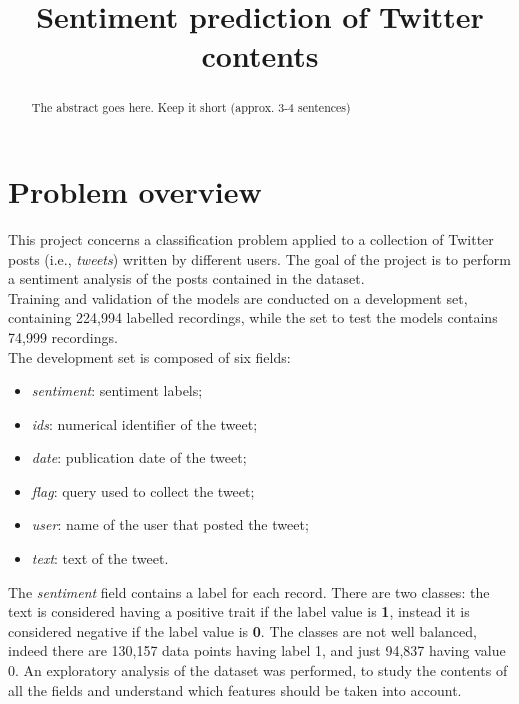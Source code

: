 \documentclass[conference]{IEEEtran}
\begin{document}
\title{Sentiment prediction of Twitter contents}

\author{
}

\maketitle

\begin{abstract}
The abstract goes here. Keep it short (approx. 3-4 sentences)
\end{abstract}

\section{Problem overview}
This project concerns a classification problem applied to a collection of Twitter posts (i.e., \textit{tweets}) written by different users. The goal of the project is to perform a sentiment analysis of the posts contained in the dataset.\\
Training and validation of the models are conducted on a development set, containing 224,994 labelled recordings, while the set to test the models contains 74,999 recordings.\\
The development set is composed of six fields:
\begin{itemize}
    \item \textit{sentiment}: sentiment labels;
    \item \textit{ids}: numerical identifier of the tweet;
    \item \textit{date}: publication date of the tweet;
    \item \textit{flag}: query used to collect the tweet;
    \item \textit{user}: name of the user that posted the tweet;
    \item \textit{text}: text of the tweet. 
\end{itemize}
The \textit{sentiment} field contains a label for each record. There are two classes: the text is considered having a positive trait if the label value is \textbf{1}, instead it is considered negative if the label value is \textbf{0}. The classes are not well balanced, indeed there are 130,157 data points having label 1, and just 94,837 having value 0. An exploratory analysis of the dataset was performed, to study the contents of all the fields and understand which features should be taken into account.\\
\end{document}
